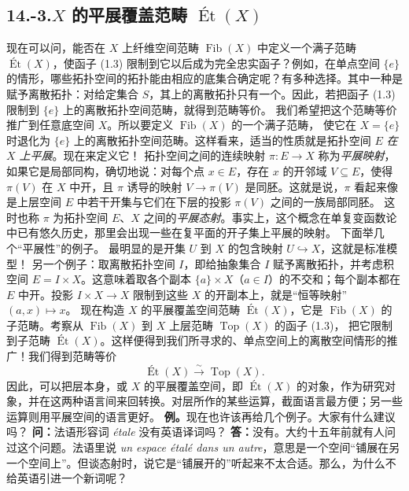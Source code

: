 \subsection*{14.-3.\quad $X$ 的平展覆盖范畴 $\operatorname{\text{Ét}}(X)$}
现在可以问，能否在 $X$ 上纤维空间范畴 $\operatorname{Fib}(X)$ 中定义一个满子范畴 $\operatorname{\text{Ét}}(X)$，使函子 (1.3) 限制到它以后成为完全忠实函子？例如，在单点空间 $\{e\}$ 的情形，哪些拓扑空间的拓扑能由相应的底集合确定呢？有多种选择。其中一种是赋予离散拓扑：对给定集合 $S$，其上的离散拓扑只有一个。因此，若把函子 (1.3) 限制到 $\{e\}$ 上的离散拓扑空间范畴，就得到范畴等价。
我们希望把这个范畴等价推广到任意底空间 $X$。所以要定义 $\operatorname{Fib}(X)$ 的一个满子范畴，
使它在 $X=\{e\}$ 时退化为 $\{e\}$ 上的离散拓扑空间范畴。这样看来，适当的性质就是拓扑空间 $E$ \emph{在 $X$ 上平展}。现在来定义它！
拓扑空间之间的连续映射 $\pi\colon E\to X$ 称为\emph{平展映射}，如果它是局部同构，确切地说：对每个点 $x\in E$，存在 $x$ 的开邻域 $V\subseteq E$，使得 $\pi(V)$ 在 $X$ 中开，且 $\pi$ 诱导的映射 $V\to\pi(V)$ 是同胚。这就是说，$\pi$ 看起来像是上层空间 $E$ 中若干开集与它们在下层的投影 $\pi(V)$ 之间的一族局部同胚。
这时也称 $\pi$ 为拓扑空间 $E$、$X$ 之间的\emph{平展态射}。事实上，这个概念在单复变函数论中已有悠久历史，那里会出现一些在复平面的开子集上平展的映射。
下面举几个“平展性”的例子。
最明显的是开集 $U$ 到 $X$ 的包含映射 $U\hookrightarrow X$，这就是标准模型！
另一个例子：取离散拓扑空间 $I$，即给抽象集合 $I$ 赋予离散拓扑，并考虑积空间 $E=I\times X$。这意味着取各个副本 $\{a\}\times X$（$a\in I$）的不交和；每个副本都在 $E$ 中开。投影 $I\times X\to X$ 限制到这些 $X$ 的开副本上，就是“恒等映射” $(a,x)\mapsto x$。
现在构造 $X$ 的平展覆盖空间范畴 $\operatorname{\text{Ét}}(X)$，它是 $\operatorname{Fib}(X)$ 的子范畴。考察从 $\operatorname{Fib}(X)$ 到 $X$ 上层范畴 $\operatorname{Top}(X)$ 的函子 (1.3)，
把它限制到子范畴 $\operatorname{\text{Ét}}(X)$。这样便得到我们所寻求的、单点空间上的离散空间情形的推广！我们得到范畴等价
\begin{equation}\tag{3.1}
 \operatorname{\text{Ét}}(X)\xrightarrow{\sim}\operatorname{Top}(X).
\end{equation}
因此，可以把层本身，或 $X$ 的平展覆盖空间，即 $\operatorname{\text{Ét}}(X)$ 的对象，作为研究对象，并在这两种语言间来回转换。对层所作的某些运算，截面语言最方便；另一些运算则用平展空间的语言更好。
\textbf{例。}现在也许该再给几个例子。大家有什么建议吗？
\textbf{问：}法语形容词 \emph{étale} 没有英语译词吗？
\textbf{答：}没有。大约十五年前就有人问过这个问题。法语里说 \emph{un espace étalé dans un autre}，意思是一个空间“铺展在另一个空间上”。但谈态射时，说它是“铺展开的”听起来不太合适。那么，为什么不给英语引进一个新词呢？
